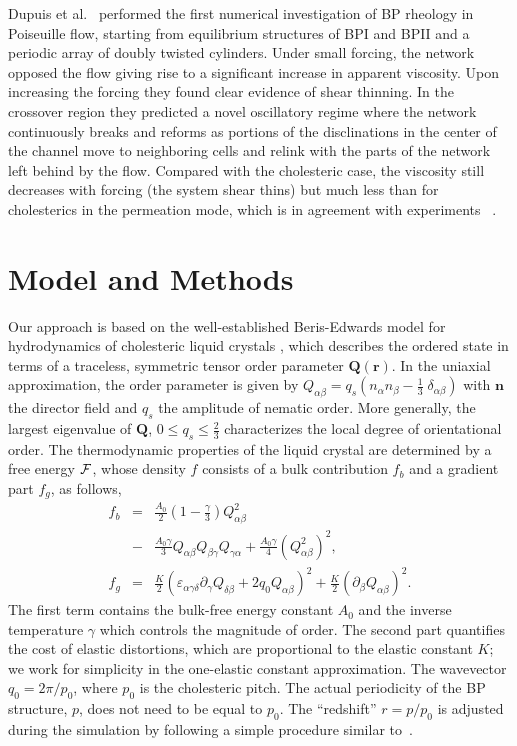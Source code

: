\documentclass[aps,pre,reprint,superscriptaddress, twocolumn]{revtex4}
\begin{document}
Dupuis et al.~\cite{Dupuis:2005} performed the first numerical investigation of BP rheology 
in Poiseuille flow, starting from equilibrium structures of BPI and BPII and a periodic 
array of doubly twisted cylinders.
Under small forcing, the network opposed the flow giving rise to a significant 
increase in apparent viscosity.
Upon increasing the forcing they found clear evidence of shear thinning.
In the crossover region they predicted a novel oscillatory regime where the network 
continuously breaks and reforms as portions of the disclinations in the center of the channel 
move to neighboring cells and relink with the parts of the network left behind by the flow. 
Compared with the cholesteric case, the viscosity still decreases with forcing 
(the system shear thins) but much less than
for cholesterics in the permeation mode, which is in agreement with experiments
~\cite{Zapotocky:1999, Ramos:2002}.

\section{Model and Methods}

Our approach is based on the well-established Beris-Edwards model for hydrodynamics of
cholesteric liquid crystals \cite{Beris:1994}, which describes the ordered state 
in terms of a traceless, symmetric tensor order parameter ${\mathbf Q}({\mathbf r})$. 
In the uniaxial approximation, the order parameter is given by
$Q_{\alpha \beta}= q_s ( n_\alpha n_\beta - \frac{1}{3}\; \delta_{\alpha\beta})$
with ${\mathbf n}$ the director field and $q_s$ the amplitude of nematic
order. More generally,
the largest eigenvalue of ${\mathbf Q}$, $0\le q_s\le\frac{2}{3}$
characterizes the local degree of orientational order.
The thermodynamic properties of the liquid crystal are determined by a free energy
${\cal F}$, whose density $f$ consists of a bulk contribution $f_b$ and a gradient part $f_g$, as follows,
\begin{eqnarray}
f_b&=&\frac{A_0}{2}\left(1-\frac{\gamma}{3}\right) Q_{\alpha \beta}^2\nonumber\\
&-&\frac{A_0 \gamma}{3}Q_{\alpha \beta} Q_{\beta \gamma} Q_{\gamma \alpha}+\frac{A_0 \gamma}{4}(Q_{\alpha \beta}^2)^2,\nonumber\\
f_g&=&\frac{K}{2}(\varepsilon_{\alpha\gamma\delta} \partial_\gamma Q_{\delta\beta}+2 q_0 Q_{\alpha \beta})^2+\frac{K}{2}(\partial_\beta Q_{\alpha \beta})^2.\label{FE}
\end{eqnarray}
The first term contains the bulk-free energy constant $A_0$ and the inverse temperature $\gamma$ which controls the magnitude of order.
The second part quantifies the cost of elastic distortions, which are proportional to the elastic constant $K$;
we work for simplicity in the one-elastic constant approximation. The wavevector $q_0=2\pi/p_0$, where $p_0$ is the cholesteric pitch.
The actual periodicity of the BP structure, $p$, does not need to be equal to $p_0$.
The ``redshift'' $r=p/p_0$ is adjusted during the simulation by following a simple procedure similar to~\cite{Alexander:2006}.
\end{document}
